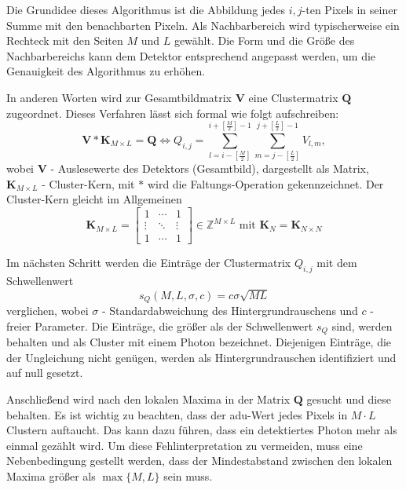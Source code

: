 \noindent
Die Grundidee dieses Algorithmus ist die Abbildung jedes $i,j$-ten Pixels in seiner Summe mit den benachbarten Pixeln. Als Nachbarbereich wird typischerweise ein Rechteck mit den Seiten $M$ und $L$ gewählt. Die Form und die Größe des Nachbarbereichs kann dem Detektor entsprechend angepasst werden, um die Genauigkeit des Algorithmus zu erhöhen.

\noindent
In anderen Worten wird zur Gesamtbildmatrix $\mathbf{V}$ eine Clustermatrix $\mathbf{Q}$ zugeordnet. Dieses Verfahren lässt sich formal wie folgt aufschreiben:
\begin{equation}
     \mathbf{V} * \mathbf{K}_{M\times L} =  \mathbf{Q} \Leftrightarrow Q_{i, j} = \sum_{l=i-\left[\frac{M}{2}\right]}^{i+\left[\frac{M}{2}\right]-1} \sum_{m=j-\left[\frac{L}{2}\right]}^{j+\left[\frac{L}{2}\right]-1} V_{l,m},
\end{equation}
wobei $\mathbf{V}$ - Auslesewerte des Detektors (Gesamtbild), dargestellt als Matrix, $\mathbf{K}_{M \times L}$ - Cluster-Kern, mit $*$ wird die Faltungs-Operation gekennzeichnet. Der Cluster-Kern gleicht im Allgemeinen
\begin{equation}
    \mathbf{K}_{M \times L}  = \begin{bmatrix}
1 & \cdots & 1\\
\vdots & \ddots & \vdots\\
1 & \cdots & 1
\end{bmatrix}
\in \mathbb{Z}^{M \times L} \text{ mit } \mathbf{K}_N = \mathbf{K}_{N \times N}
\label{eq:cluster-kern}
\end{equation}

\noindent
Im nächsten Schritt werden die Einträge der Clustermatrix $Q_{i,j}$ mit dem Schwellenwert 
\begin{equation}
    s_Q(M, L, \sigma, c) = c\sigma\sqrt{ML}
\end{equation}
verglichen, wobei $\sigma$ - Standardabweichung des Hintergrundrauschens und $c$ - freier Parameter. Die Einträge, die größer als der Schwellenwert $s_Q$ sind, werden behalten und als Cluster mit einem Photon bezeichnet. Diejenigen Einträge, die der Ungleichung nicht genügen, werden als Hintergrundrauschen identifiziert und auf null gesetzt.

\noindent
Anschließend wird nach den lokalen Maxima in der Matrix $\mathbf{Q}$ gesucht und diese behalten. Es ist wichtig zu beachten, dass der \gls{adu}-Wert jedes Pixels in $M\cdot L$ Clustern auftaucht. Das kann dazu führen, dass ein detektiertes Photon mehr als einmal gezählt wird. Um diese Fehlinterpretation zu vermeiden, muss eine Nebenbedingung gestellt werden, dass der Mindestabstand zwischen den lokalen Maxima größer als $\max\{M,L\}$ sein muss.

